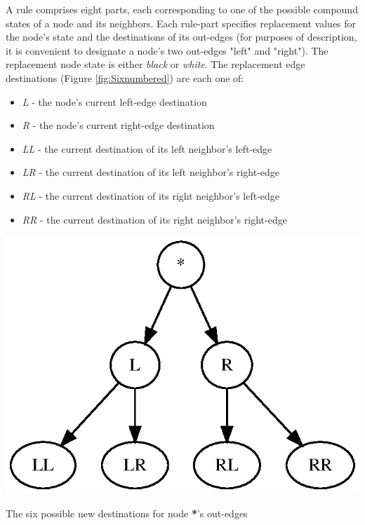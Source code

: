 \documentclass{tufte-handout}
\begin{document}
A rule comprises eight parts, each corresponding to one of the possible compound states
of a node and its neighbors. Each rule-part specifies replacement values for
the node's state and the destinations of its out-edges
(for purposes of description, it is convenient to designate a node's two out-edges "left" and "right").
The replacement node state is either \textit{black} or \textit{white}.
The replacement edge destinations (Figure \ref{fig:Sixnumbered}) are each one of:

\vspace{1mm}
\begin{itemize}
\setlength{\itemindent}{2em}
    \item \textit{L} - the node's current left-edge destination
    \item \textit{R} - the node's current right-edge destination
    \item \textit{LL} - the current destination of its left neighbor's left-edge
    \item \textit{LR} - the current destination of its left neighbor's right-edge
    \item \textit{RL} - the current destination of its right neighbor's left-edge
    \item \textit{RR} - the current destination of its right neighbor's right-edge
\end{itemize}
\vspace{2mm}

\begin{marginfigure}
\hspace{-4em}
\includegraphics{sixnumbered.ps}
\caption{The six possible new destinations for node \textbf{*}'s out-edges}
\label{fig:Sixnumbered}
\end{marginfigure}
\end{document}
